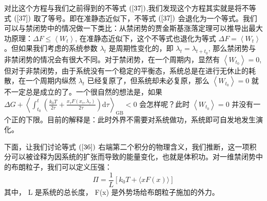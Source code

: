对比这个方程与我们之前得到的不等式  $(\ref{37})$,我们发现这个方程其实就是将不等式  $(\ref{37})$  取了等号。即在准静态近似下，不等式  $(\ref{37})$  会退化为一个等式。我们可以与禁闭势中的情况做一下类比：从禁闭势的贾金斯基涨落定理可以推导出最大功原理：$\Delta F \leq \left\langle W_{t}\right\rangle$,  在准静态近似下，这个不等式也退化为等式  $\Delta F =\left\langle W_{t}\right\rangle$。但如果我们考虑的系统参数  $\lambda_{t}$  是周期性变化的，即  $\lambda_{t}=\lambda_{t+t_{0}}$,  那么禁闭势与非禁闭势的情况会有很大不同。对于禁闭势，在一个周期内，显然有  $\left\langle W_{t_{0}}\right\rangle=0$,  但对于非禁闭势，由于系统没有一个稳定的平衡态，系统总是在进行无休止的耗散，在一个周期内纵然  $\lambda_{t}$  已经复原了，但系统却未必复原，那么  $\left\langle W_{t_{0}}\right\rangle=0$  就不一定总是成立的了。一个很自然的想法是，如果  $\Delta G+\left\langle\int_{t_{0}}^{t}\left(\frac{k_{0} T}{2 \tau}+\frac{x_{\tau} F\left(x_{\tau}, \lambda_{\tau}\right)}{2 \tau}\right) \mathrm{d} \tau\right\rangle_{\mathrm{GB}}<0$  会怎样呢？此时  $\left\langle W_{t_{0}}\right\rangle=0$  并没有一个正的下限。目前的解释是：此时外界不需要对系统做功，系统即可自发地发生演化。

下面，让我们讨论等式  $(\ref{36})$  右端第二个积分的物理含义，我们推断，这一项积分可以被诠释为因系统的扩张而导致的能量变化，也就是体积功。对一维禁闭势中的布朗粒子，我们可以定义压强：
\begin{equation}\label{Pi}
\Pi=\frac{1}{L}\left[k_{0} T+\langle x F(x)\rangle\right]
\end{equation}
其中，  L 是系统的总长度，  F(x)  是外势场给布朗粒子施加的外力。

